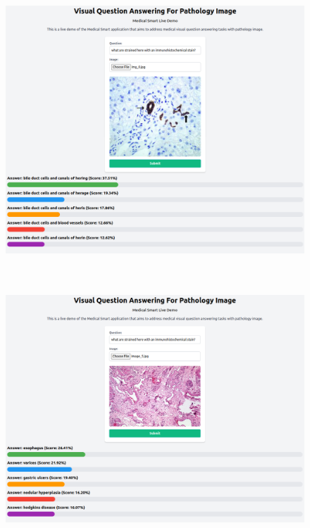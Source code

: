 

  \begin{figure}[H]
    \centering
    \includegraphics[width=\textwidth, height=10cm]{image/lampiran/patologi-1.png}
  \end{figure}

  \begin{figure}[H]
    \centering
    \includegraphics[width=\textwidth, height=10cm]{image/lampiran/patologi-2.png}
  \end{figure}

